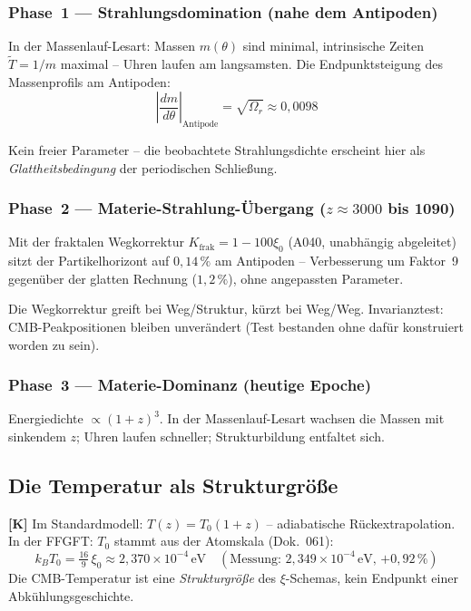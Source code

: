 \subsubsection{Phase~1 --- Strahlungsdomination (nahe dem Antipoden)}

In der Massenlauf-Lesart: Massen $m(\theta)$ sind minimal,
intrinsische Zeiten $\tilde{T} = 1/m$ maximal – Uhren laufen am
langsamsten. Die Endpunktsteigung des Massenprofils am Antipoden:
\[
\left|\frac{dm}{d\theta}\right|_\text{Antipode}
= \sqrt{\Omega_r} \approx 0{,}0098
\]

Kein freier Parameter – die beobachtete Strahlungsdichte erscheint
hier als \emph{Glattheitsbedingung} der periodischen Schließung.

\subsubsection{Phase~2 --- Materie-Strahlung-Übergang ($z \approx 3000$ bis 1090)}

Mit der fraktalen Wegkorrektur $K_\text{frak} = 1-100\xi_0$ (A040,
unabhängig abgeleitet) sitzt der Partikelhorizont auf $0{,}14\,\%$
am Antipoden – Verbesserung um Faktor~9 gegenüber der glatten
Rechnung ($1{,}2\,\%$), ohne angepassten Parameter.

Die Wegkorrektur greift bei Weg/Struktur, kürzt bei Weg/Weg.
Invarianztest: CMB-Peakpositionen bleiben unverändert
(Test bestanden ohne dafür konstruiert worden zu sein).

\subsubsection{Phase~3 --- Materie-Dominanz (heutige Epoche)}

Energiedichte $\propto (1+z)^3$. In der Massenlauf-Lesart wachsen
die Massen mit sinkendem $z$; Uhren laufen schneller; Strukturbildung
entfaltet sich.

\subsection{Die Temperatur als Strukturgröße}

\textbf{[K]} Im Standardmodell: $T(z) = T_0(1+z)$ – adiabatische
Rückextrapolation. In der FFGFT: $T_0$ stammt aus der Atomskala
(Dok.~061):
\[
k_B T_0 = \tfrac{16}{9}\,\xi_0 \approx 2{,}370\times10^{-4}\,\text{eV}
\quad(\text{Messung: }2{,}349\times10^{-4}\,\text{eV, }{+0{,}92\,\%})
\]
Die CMB-Temperatur ist eine \emph{Strukturgröße} des $\xi$-Schemas,
kein Endpunkt einer Abkühlungsgeschichte.

